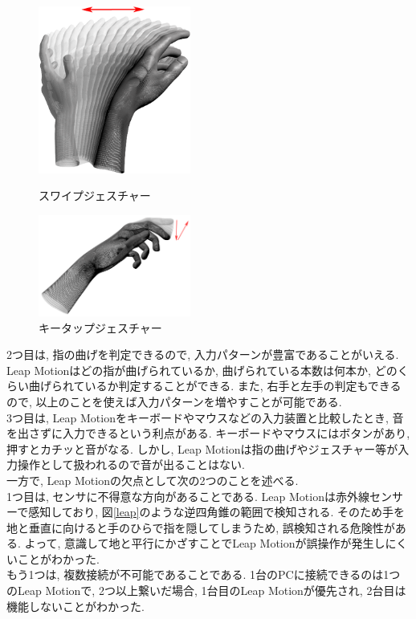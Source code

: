 \documentclass{funthesis}
\begin{document}
\begin{figure}[H]
 \begin{minipage}{0.5\hsize}
  \begin{center}
  \includegraphics[width=50mm]{./img/Swipe.png}
  \end{center}
  \caption{スワイプジェスチャー}
  \label{swipe}
 \end{minipage}
 \begin{minipage}{0.5\hsize}
  \begin{center}
  \includegraphics[width=50mm]{./img/KeyTap.png}
  \end{center}
  \caption{キータップジェスチャー}
  \label{keytap}
 \end{minipage}
\end{figure}

 
  2つ目は, 指の曲げを判定できるので, 入力パターンが豊富であることがいえる. Leap Motionはどの指が曲げられているか, 曲げられている本数は何本か, どのくらい曲げられているか判定することができる. また, 右手と左手の判定もできるので, 以上のことを使えば入力パターンを増やすことが可能である. \\
  3つ目は, Leap Motionをキーボードやマウスなどの入力装置と比較したとき, 音を出さずに入力できるという利点がある. キーボードやマウスにはボタンがあり, 押すとカチッと音がなる. しかし, Leap Motionは指の曲げやジェスチャー等が入力操作として扱われるので音が出ることはない. \\
  一方で, Leap Motionの欠点として次の2つのことを述べる.\\
  1つ目は, センサに不得意な方向があることである. Leap Motionは赤外線センサーで感知しており,  図\ref{leap}のような逆四角錐の範囲で検知される. そのため手を地と垂直に向けると手のひらで指を隠してしまうため, 誤検知される危険性がある. よって, 意識して地と平行にかざすことでLeap Motionが誤操作が発生しにくいことがわかった.\\
  もう1つは, 複数接続が不可能であることである. 1台のPCに接続できるのは1つのLeap Motionで, 2つ以上繋いだ場合, 1台目のLeap Motionが優先され, 2台目は機能しないことがわかった.\\
 
\end{document}
